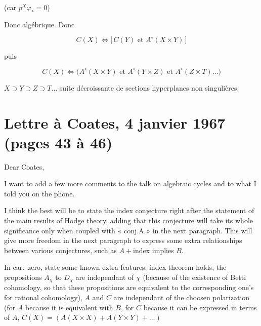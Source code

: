 \documentclass[11pt,a4paper]{article}
\begin{document}
(car $p^{X}\varphi_{*} = 0$)

Donc  algébrique. Donc 

\[
  C(X) \Longleftrightarrow \bigl[\,C(Y) \text{ et } A^{\circ}(X \times Y)\,\bigr]
\]

puis 

\[
  C(X) \Longleftrightarrow \bigl(A^{\circ}(X \times Y) \text{ et }
  A^{\circ}(Y \times Z) \text{ et } A^{\circ}(Z \times T) \dots\bigr)
\]

 $X \supset Y \supset Z \supset T \dots$ 
suite décroissante de sections hyperplanes non singulières.

\section*{Lettre à Coates, 4 janvier 1967 (pages 43 à 46)}



Dear Coates,

I want to add a few more comments to the talk on algebraic cycles and to what I
told you on the phone.

I think the best will be to state the index conjecture right after the statement
of the main results of Hodge theory, adding that this conjecture will take its
whole significance only when coupled with « conj.A » in the next paragraph. This
will give more freedom in the next paragraph to express some extra relationships
between various conjectures, such as $A + \text{index}$ implies $B$.

In car.\ zero, state some known extra features: index theorem holds, the
 propositions $A_{\chi}$ to $D_{\chi}$ are independant of
$\chi$ (because of the existence of Betti cohomology, so that these
 propositions are equivalent to the corresponding one's for
rational cohomology),  $A$ and $C$ are independant of the choosen
polarization  (for $A$ because it is equivalent with $B$, for $C$
because it can be expressed in terms of $A$,
$C(X) = (A(X \times X) + A(Y \times Y) + \dots)$
\end{document}
